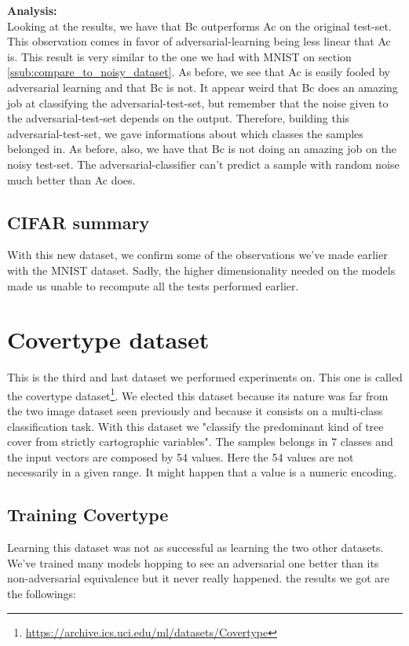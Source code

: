			\vskip 1cm
			\textbf{Analysis:}\\
			Looking at the results, we have that Bc outperforms Ac on the original test-set. This observation comes in favor of adversarial-learning being less linear that Ac is. This result is very similar to the one we had with MNIST on section \ref{ssub:compare_to_noisy_dataset}. As before, we see that Ac is easily fooled by adversarial learning and that Bc is not. It appear weird that Bc does an amazing job at classifying the adversarial-test-set, but remember that the noise given to the adversarial-test-set depends on the output. Therefore, building this adversarial-test-set, we gave informations about which classes the samples belonged in.
			As before, also, we have that Bc is not doing an amazing job on the noisy test-set. The adversarial-classifier can't predict a sample with random noise much better than Ac does.

		\subsection{CIFAR summary}
			With this new dataset, we confirm some of the observations we've made earlier with the MNIST dataset. Sadly, the higher dimensionality needed on the models made us unable to recompute all the tests performed earlier.
	

	\section{Covertype dataset}
	\label{sub:covertype_dataset}
		This is the third and last dataset we performed experiments on. This one is called the covertype dataset\footnote{\url{https://archive.ics.uci.edu/ml/datasets/Covertype}}. We elected this dataset because its nature was far from the two image dataset seen previously and because it consists on a multi-class classification task. With this dataset we "classify the predominant kind of tree cover from strictly cartographic variables". The samples belongs in 7 classes and the input vectors are composed by 54 values. Here the 54 values are not necessarily in a given range. It might happen that a value is a numeric encoding.

		\subsection{Training Covertype}
			Learning this dataset was not as successful as learning the two other datasets. We've trained many models hopping to see an adversarial one better than its non-adversarial equivalence but it never really happened. the results we got are the followings:

